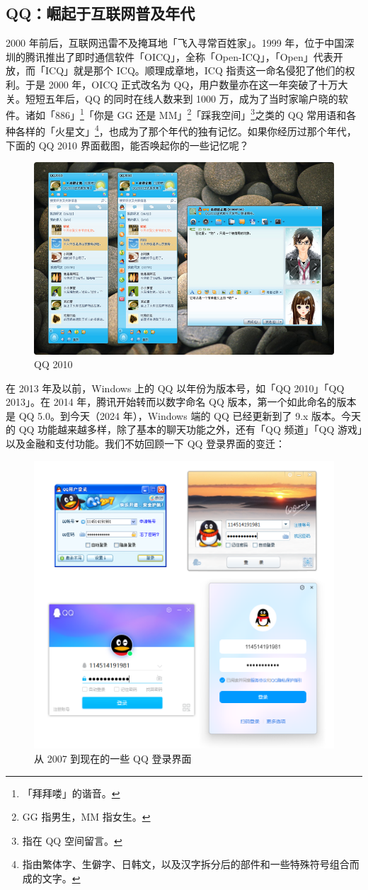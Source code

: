 \subsection{QQ：崛起于互联网普及年代}

2000 年前后，互联网迅雷不及掩耳地「飞入寻常百姓家」。1999 年，位于中国深圳的腾讯推出了即时通信软件「OICQ」，全称「Open-ICQ」，「Open」代表开放，而「ICQ」就是那个 ICQ。顺理成章地，ICQ 指责这一命名侵犯了他们的权利。于是 2000 年，OICQ 正式改名为 QQ，用户数量亦在这一年突破了十万大关。短短五年后，QQ 的同时在线人数来到 1000 万，成为了当时家喻户晓的软件。诸如「886」\footnote{「拜拜喽」的谐音。}「你是 GG 还是 MM」\footnote{GG 指男生，MM 指女生。}「踩我空间」\footnote{指在 QQ 空间留言。}之类的 QQ 常用语和各种各样的「火星文」\footnote{指由繁体字、生僻字、日韩文，以及汉字拆分后的部件和一些特殊符号组合而成的文字。}，也成为了那个年代的独有记忆。如果你经历过那个年代，下面的 QQ 2010 界面截图，能否唤起你的一些记忆呢？

\begin{figure}[htb!]
  \centering
  \includegraphics[width=.65\textwidth]{assets/software/QQ2010.jpg}
  \caption{QQ 2010}
  \label{fig:QQ2010}
\end{figure}

在 2013 年及以前，Windows 上的 QQ 以年份为版本号，如「QQ 2010」「QQ 2013」。在 2014 年，腾讯开始转而以数字命名 QQ 版本，第一个如此命名的版本是 QQ 5.0。到今天（2024 年），Windows 端的 QQ 已经更新到了 9.x 版本。今天的 QQ 功能越来越多样，除了基本的聊天功能之外，还有「QQ 频道」「QQ 游戏」以及金融和支付功能。我们不妨回顾一下 QQ 登录界面的变迁：

\begin{figure}[htb!]
  \centering
  \includegraphics[width=.65\textwidth]{assets/software/QQ_login_history.png}
  \caption{从 2007 到现在的一些 QQ 登录界面}
  \label{fig:QQ_login_history}
\end{figure}

